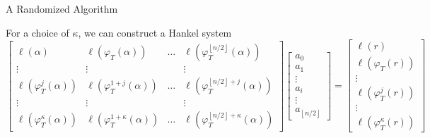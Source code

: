 \documentclass{beamer}
\begin{document}
    \begin{frame}{A Randomized Algorithm}


    \item For a choice of $\kappa$, we can construct a Hankel system
\[ \begin{bmatrix}\ell(\alpha) & \ell(\varphi_T(\alpha)) & \ldots & \ell(\varphi_T^{\left\lfloor n/2 \right\rfloor}(\alpha)) \\ \vdots & \vdots & & \vdots \\ 

\ell(\varphi_T^{j}(\alpha)) & \ell(\varphi_T^{1+j}(\alpha)) & \ldots & \ell(\varphi_T^{\left\lfloor n/2 \right\rfloor+j}(\alpha)) \\ \vdots & \vdots & & \vdots \\

\ell(\varphi_T^{\kappa}(\alpha)) & \ell(\varphi_T^{1 + \kappa }(\alpha)) & \ldots & \ell(\varphi_T^{\left\lfloor n/2 \right\rfloor + \kappa}(\alpha))

\end{bmatrix} \begin{bmatrix} a_0 \\ a_1 \\ \vdots \\ a_i \\ \vdots \\ a_{\left\lfloor n/2 \right\rfloor} \end{bmatrix} = \begin{bmatrix} \ell(r) \\ \ell(\varphi_T(r)) \\ \vdots \\ \ell(\varphi_T^j(r)) \\ \vdots  \\   \ell(\varphi_T^{\kappa}(r)) \end{bmatrix} \]
    
\end{frame}



\end{document}
